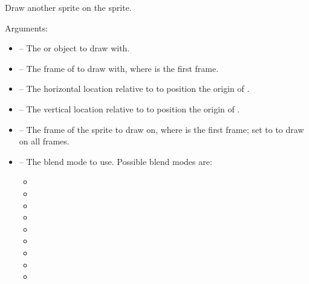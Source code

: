 \documentclass[letterpaper,10pt,english]{sphinxmanual}
\begin{document}
\begin{fulllineitems}
\label{gfx:sge.gfx.Sprite.draw_sprite}
Draw another sprite on the sprite.

Arguments:
\begin{itemize}
\item {} 
 -- The {\hyperref[gfx:sge.gfx.Sprite]{\emph{}}} or
 object to draw with.

\item {} 
 -- The frame of  to draw with, where 
is the first frame.

\item {} 
 -- The horizontal location relative to  to
position the origin of .

\item {} 
 -- The vertical location relative to  to
position the origin of .

\item {} 
 -- The frame of the sprite to draw on, where 
is the first frame; set to  to draw on all
frames.

\item {} 
 -- The blend mode to use.  Possible blend modes
are:
\begin{itemize}
\item {} 

\item {} 

\item {} 

\item {} 

\item {} 

\item {} 

\item {} 

\item {} 

\item {} 


\end{itemize}
\end{itemize}
\end{fulllineitems}
\end{document}
